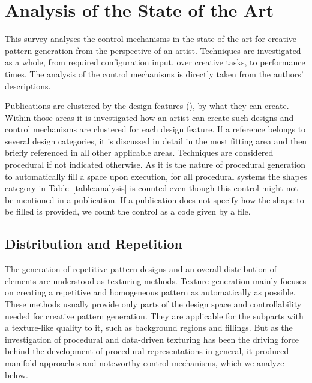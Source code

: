 

\section{Analysis of the State of the Art}
\label{sec:analysis}

This survey analyses the control mechanisms in the state of the art for creative pattern generation from the perspective of an artist. Techniques are investigated as a whole, from required configuration input, over creative tasks, to performance times. The analysis of the control mechanisms is directly taken from the authors' descriptions. 

Publications are clustered by the design features (), \ie by what they can create. Within those areas it is investigated how an artist can create such designs and control mechanisms are clustered for each design feature. If a reference belongs to several design categories, it is discussed in detail in the most fitting area and then briefly referenced in all other applicable areas. Techniques are considered procedural if not indicated otherwise. As it is the nature of procedural generation to automatically fill a space upon execution, for all procedural systems the shapes category in Table~\ref{table:analysis} is counted even though this control might not be mentioned in a publication. 
If a publication does not specify how the shape to be filled is provided, we count the control as a code given by a file.

\subsection{Distribution and Repetition}
\label{subsec:analysis_distribution_and_repetition}

The generation of repetitive pattern designs and an overall distribution of elements are understood as texturing methods. Texture generation mainly focuses on creating a repetitive and homogeneous pattern as automatically as possible. These methods usually provide only parts of the design space and controllability needed for creative pattern generation. They are applicable for the subparts with a texture-like quality to it, such as background regions and fillings. But as the investigation of procedural and data-driven texturing has been the driving force behind the development of procedural representations in general, it produced manifold approaches and noteworthy control mechanisms, which we analyze below.


